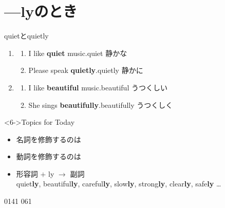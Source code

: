\documentclass[aspectratio=169,xcolor={dvipsnames,table}]{beamer}
\begin{document}
\section{---lyのとき}
\begin{frame}[plain]{quietとquietly}
 
\begin{enumerate}
 \item<2-> \begin{enumerate}
	\item<2-> I like \textbf{quiet} music.\hfill{}quiet   静かな
	\item<3-> Please speak \textbf{quietly}.\hfill{}quietly   静かに
       \end{enumerate}
 \item<4-> \begin{enumerate}
	\item<4-> I like \textbf{beautiful} music.\hfill{}beautiful   うつくしい
	\item<5-> She sings \textbf{beautifully}.\hfill{}beautifully   うつくしく
       \end{enumerate}
\end{enumerate}

\begin{block}<6->{Topics for Today}
\begin{itemize}[square]\small
 \item 名詞を修飾するのは
 \item 動詞を修飾するのは
 \item 形容詞 $+$ ly $\longrightarrow$ 副詞\\
\hfill{} quiet\textbf{ly}, beautiful\textbf{ly}, careful\textbf{ly}, slow\textbf{ly}, strong\textbf{ly}, clear\textbf{ly}, safe\textbf{ly} \ldots
\end{itemize}
     \end{block}

\hfill{\tiny 0141}\,{\scriptsize {}\,061}

\end{frame}
\end{document}
